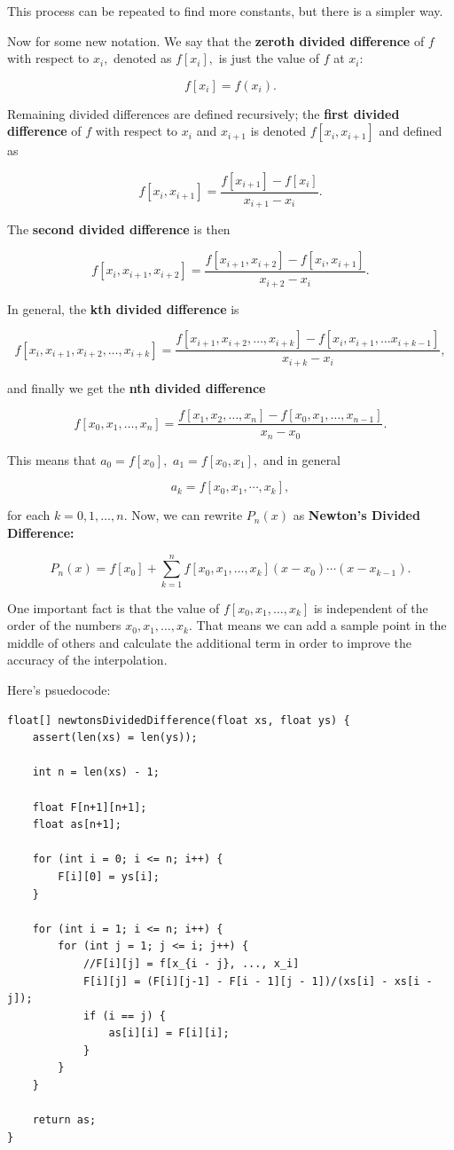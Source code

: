 \documentclass{article}
\begin{document}
This process can be repeated to find more constants, but there is a simpler way.

Now for some new notation. We say that the \textbf{zeroth divided difference} of $f$ with respect to $x_i,$ denoted as $f[x_i],$ is just the value of $f$ at $x_i:$

\[ f[x_i] = f(x_i). \]

Remaining divided differences are defined recursively; the \textbf{first divided difference} of $f$ with respect to $x_i$ and $x_{i+1}$ is denoted $f[x_i, x_{i+1}]$ and defined as

\[ f[x_i, x_{i+1}] = \frac{f[x_{i+1}] - f[x_i]}{x_{i+1} - x_i}. \]

The \textbf{second divided difference} is then

\[ f[x_i, x_{i+1}, x_{i+2}] = \frac{f[x_{i+1}, x_{i+2}] - f[x_i, x_{i+1}]}{x_{i+2} - x_i}. \]

In general, the \textbf{kth divided difference} is

\[ f[x_i, x_{i+1}, x_{i+2}, \dots, x_{i+k}] = \frac{f[x_{i+1}, x_{i+2}, \dots, x_{i+k}] - f[x_i, x_{i+1}, \dots x_{i+k-1}]}{x_{i+k} - x_i}, \]

and finally we get the \textbf{nth divided difference}

\[ f[x_0, x_1, \dots, x_n] = \frac{f[x_1, x_2, \dots, x_n] - f[x_0, x_1, \dots, x_{n-1}]}{x_n - x_0}. \]

This means that $a_0 = f[x_0],$ $a_1 = f[x_0, x_1],$ and in general

\[ a_k = f[x_0, x_1, \cdots, x_k], \]

for each $k = 0, 1, \dots, n.$ Now, we can rewrite $P_n(x)$ as \textbf{Newton's Divided Difference:}

\[ P_n(x) = f[x_0] + \sum_{k=1}^{n} f[x_0, x_1, \dots, x_k](x - x_0)\cdots(x - x_{k-1}). \]

One important fact is that the value of $f[x_0, x_1, \dots, x_k]$ is independent of the order of the numbers $x_0, x_1, \dots, x_k.$ That means we can add a sample point in the middle of others and calculate the additional term in order to improve the accuracy of the interpolation.

Here's psuedocode:

\begin{verbatim}
float[] newtonsDividedDifference(float xs, float ys) {
    assert(len(xs) = len(ys));

    int n = len(xs) - 1;

    float F[n+1][n+1];
    float as[n+1];

    for (int i = 0; i <= n; i++) {
        F[i][0] = ys[i];
    }

    for (int i = 1; i <= n; i++) {
        for (int j = 1; j <= i; j++) {
            //F[i][j] = f[x_{i - j}, ..., x_i]
            F[i][j] = (F[i][j-1] - F[i - 1][j - 1])/(xs[i] - xs[i - j]);
            if (i == j) {
                as[i][i] = F[i][i];
            }
        }
    }

    return as;
}
\end{verbatim}
\end{document}
